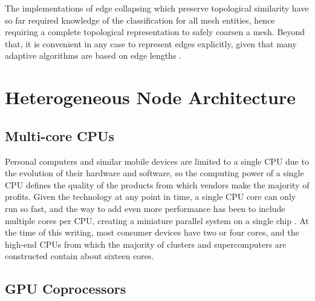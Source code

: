 The implementations of edge collapsing which preserve
topological similarity have so far required knowledge
of the classification for all mesh entities,
hence requiring a complete topological representation \cite{seol2006efficient}
to safely coarsen a mesh.
Beyond that, it is convenient in any case to represent
edges explicitly, given that many adaptive algorithms
are based on edge lengths \cite{biswas1998tetrahedral}.

\section{Heterogeneous Node Architecture}

\subsection{Multi-core CPUs}

Personal computers and similar mobile devices are limited
to a single CPU due to the evolution of their hardware and
software, so the computing power of a single CPU defines
the quality of the products from which vendors make
the majority of profits.
Given the technology at any point in time, a single CPU
core can only run so fast, and the way to add even more performance
has been to include multiple cores per CPU,
creating a miniature parallel system on a single chip
\cite{hennessy2011computer}.
At the time of this writing, most consumer devices
have two or four cores, and the high-end CPUs from
which the majority of clusters and supercomputers are constructed
contain about sixteen cores.

\subsection{GPU Coprocessors}

